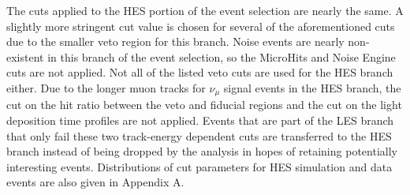 \documentclass{gatech-thesis}
\begin{document}
The cuts applied to the HES portion of the event selection are nearly the same. A slightly more stringent cut value is chosen for several of the aforementioned cuts due to the smaller veto region for this branch. Noise events are nearly non-existent in this branch of the event selection, so the MicroHits and Noise Engine cuts are not applied. Not all of the listed veto cuts are used for the HES branch either. Due to the longer muon tracks for $\nu_{\mu}$ signal events in the HES branch, the cut on the hit ratio between the veto and fiducial regions and the cut on the light deposition time profiles are not applied. Events that are part of the LES branch that only fail these two track-energy dependent cuts are transferred to the HES branch instead of being dropped by the analysis in hopes of retaining potentially interesting events. Distributions of cut parameters for HES simulation and data events are also given in Appendix A.
\end{document}
